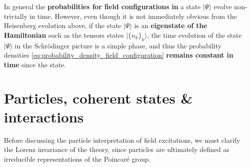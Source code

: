 \documentclass[../QFT_main.tex]{subfiles}
\begin{document}
\begin{mytheorem}
In general the \textbf{probabilities for field configurations in} a state $|\Psi\rangle$ evolve non-trivially in time.
However, even though it is not immediately obvious from the Heisenberg evolution above, if the state $|\Psi\rangle$ is an \textbf{eigenstate of the Hamiltonian} such as the tensors states $|\{n_k\}_k\rangle$, the time evolution of the state $|\Psi\rangle$ in the Schrödinger picture is a simple phase, and thus the probability densities \eqref{eq:probability_density_field_configuration} \textbf{remains constant in time} since the state.
\end{mytheorem}





\section{Particles, coherent states \& interactions}\label{sec:kg_field_particles_coherent_interactions}


Before discussing the particle interpretation of field excitations, we must clarify the Lorenz invariance of the theory, since particles are ultimately defined as irreducible representations of the Poincaré group.
\end{document}
